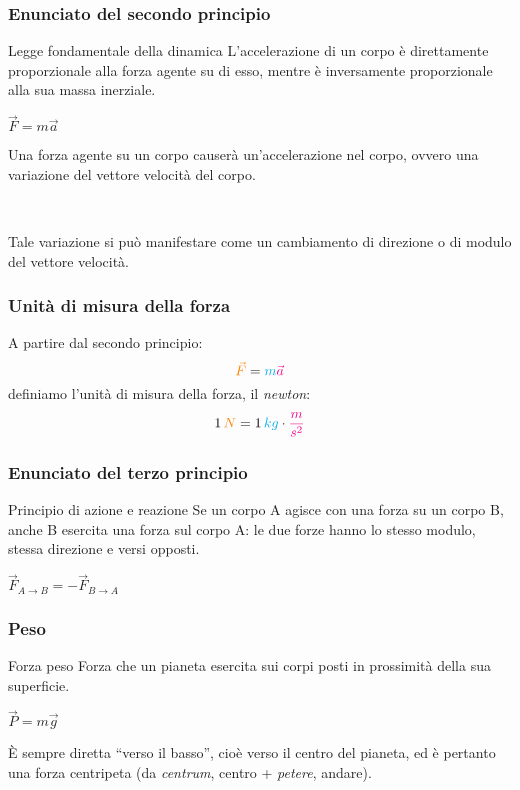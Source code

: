 \documentclass[]{beamer}
\theoremstyle{plain}
\begin{document}
\begin{frame}
  \frametitle{Enunciato del secondo principio}
\begin{block}{Legge fondamentale della dinamica}
L'accelerazione di un corpo è direttamente proporzionale alla forza agente su di esso, mentre è inversamente proporzionale alla sua massa inerziale.\pause
\begin{center}
\colorbox{blue!30}{$ \vec{F} = m \vec{a} $}
\end{center}
\end{block}
\pause
Una forza agente su un corpo causerà un'accelerazione nel corpo, ovvero una \alert<3>{variazione del vettore velocità} del corpo.\pause

~

Tale variazione si può manifestare come un \alert<4>{cambiamento di direzione o di modulo} del vettore velocità.
\end{frame}




\begin{frame}
  \frametitle{Unità di misura della forza}
  A partire dal secondo principio: \[ \textcolor{orange}{\vec{F}} = \textcolor{cyan}{m}  \textcolor{magenta}{\vec{a}}  \]
  definiamo l'unità di misura della forza, il \emph{newton}:
  \[ 1 \, \textcolor{orange}{N} = 1 \, \textcolor{cyan}{kg} \cdot \textcolor{magenta}{\frac{m}{s^2}} \]
\end{frame}




\begin{frame}
  \frametitle{Enunciato del terzo principio}
\begin{block}{Principio di azione e reazione}
Se un corpo A agisce con una forza su un corpo B, anche B esercita una forza sul corpo A: le due forze hanno lo stesso modulo, stessa direzione e versi opposti.\pause
\begin{center}
\colorbox{blue!30}{$ \vec{F}_{A \rightarrow B} = - \vec{F}_{B \rightarrow A} $}
\end{center}
\end{block}
\end{frame}



\begin{frame}
  \frametitle{Peso}
\begin{block}{Forza peso}
Forza che un pianeta esercita sui corpi posti in prossimità della sua superficie.\pause
\begin{center}
\colorbox{blue!30}{$ \vec{P} = m \vec{g} $}
\end{center}
\end{block}\pause
È sempre diretta ``verso il basso'', cioè verso il centro del pianeta, ed è pertanto una forza \alert{centripeta} (da \emph{centrum}, centro + \emph{petere}, andare).
\end{frame}
\end{document}
